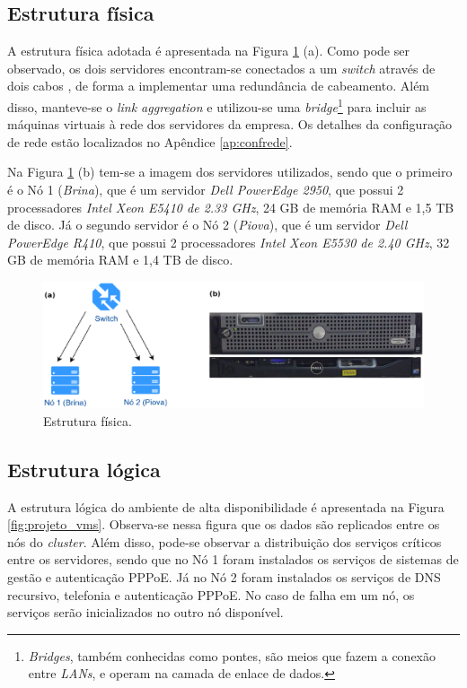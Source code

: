 \subsection{Estrutura física}

A estrutura física adotada é apresentada na Figura \ref{fig:projeto_fisico} (a). Como pode ser observado, os dois servidores encontram-se 
conectados a um \textit{switch} através de dois cabos , de forma a implementar uma redundância de cabeamento. Além disso, manteve-se o 
\textit{link aggregation} e utilizou-se uma \textit{bridge}\footnote[1]{\textit{Bridges}, também conhecidas como pontes, são meios que fazem a 
conexão entre \textit{LANs}, e operam na camada de enlace de dados.} para incluir as máquinas virtuais à rede dos servidores da empresa. 
Os detalhes da configuração de rede estão localizados no Apêndice \ref{ap:confrede}.

Na Figura \ref{fig:projeto_fisico} (b) tem-se a imagem dos servidores utilizados, sendo que o primeiro é o Nó 1 (\textit{Brina}), que é um servidor
\textit{Dell PowerEdge 2950}, que possui 2 processadores \textit{Intel Xeon E5410 de 2.33 GHz}, 24 GB de memória \ac{RAM} e 1,5 TB de disco. 
Já o segundo servidor é o Nó 2 (\textit{Piova}), que é um servidor \textit{Dell PowerEdge R410}, que possui 2 processadores 
\textit{Intel Xeon E5530 de 2.40 GHz}, 32 GB de memória \ac{RAM} e 1,4 TB de disco.

\begin{figure}[h!]
 \centering
 \includegraphics[width=450px]{img/projeto_fisico.eps}
 \caption{Estrutura física.}
 \label{fig:projeto_fisico}
\end{figure}

\subsection{Estrutura lógica}

A estrutura lógica do ambiente de alta disponibilidade é apresentada na Figura \ref{fig:projeto_vms}. Observa-se nessa figura que os dados são
replicados entre os nós do \textit{cluster}. Além disso, pode-se observar a distribuição dos serviços críticos entre os servidores, sendo que 
no Nó 1 foram instalados os serviços de sistemas de gestão e autenticação \ac{PPPoE}. Já no Nó 2 foram instalados os serviços de \ac{DNS} 
recursivo, telefonia e autenticação \ac{PPPoE}. No caso de falha em um nó, os serviços serão inicializados no outro nó disponível. 

